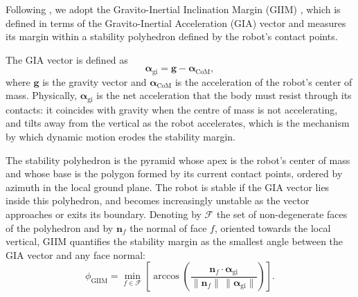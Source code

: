 Following \citep{Valsecchi2023}, we adopt the Gravito-Inertial Inclination Margin (GIIM) \citep{Ribeiro2020GIIM}, which is defined in terms of the Gravito-Inertial Acceleration (GIA) vector and measures its margin within a stability polyhedron defined by the robot's contact points.

The GIA vector is defined as
%
\begin{equation}
    \boldsymbol{\alpha}_{\text{gi}} = \boldsymbol{g} - \boldsymbol{\alpha}_{\text{CoM}},
    \label{eq:gia}
\end{equation}
%
where $\boldsymbol{g}$ is the gravity vector and $\boldsymbol{\alpha}_{\text{CoM}}$ is the acceleration of the robot's center of mass. Physically, $\boldsymbol{\alpha}_{\text{gi}}$ is the net acceleration that the body must resist through its contacts: it coincides with gravity when the centre of mass is not accelerating, and tilts away from the vertical as the robot accelerates, which is the mechanism by which dynamic motion erodes the stability margin.

The stability polyhedron is the pyramid whose apex is the robot's center of mass and whose base is the polygon formed by its current contact points, ordered by azimuth in the local ground plane. The robot is stable if the GIA vector lies inside this polyhedron, and becomes increasingly unstable as the vector approaches or exits its boundary. Denoting by $\mathcal{F}$ the set of non-degenerate faces of the polyhedron and by $\boldsymbol{n}_f$ the normal of face $f$, oriented towards the local vertical, GIIM quantifies the stability margin as the smallest angle between the GIA vector and any face normal:
%
\begin{equation}
    \phi_{\text{GIIM}} = \min_{f\in\mathcal{F}} \left[
        \arccos\left(
            \frac{\boldsymbol{n}_{f} \cdot \boldsymbol{\alpha}_{\text{gi}}}
                 {\lVert \boldsymbol{n}_{f} \rVert \,\lVert \boldsymbol{\alpha}_{\text{gi}} \rVert}
        \right)
    \right].
    \label{eq:giim}
\end{equation}

